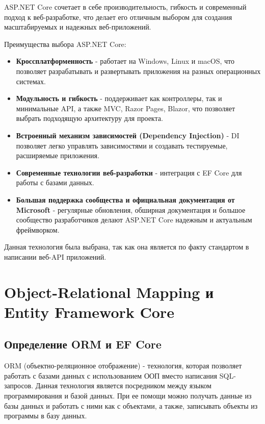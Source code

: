 \documentclass[a4paper,12pt]{report}
\begin{document}
ASP.NET Core сочетает в себе производительность, гибкость и современный подход к веб-разработке, что делает его отличным выбором 
для создания масштабируемых и надежных веб-приложений.

Преимущества выбора ASP.NET Core:
\begin{itemize}
    \item
        \textbf{Кроссплатформенность} - работает на Windows, Linux и macOS, что позволяет разрабатывать и развертывать приложения на разных операционных системах.
    \item 
        \textbf{Модульность и гибкость} - поддерживает как контроллеры, так и минимальные \acs{API}, а также \acs{MVC}, Razor Pages, Blazor, что позволяет выбрать 
        подходящую архитектуру для проекта.
    \item
        \textbf{Встроенный механизм зависимостей (Dependency Injection)} - \acs{DI} позволяет легко управлять зависимостями и создавать тестируемые, расширяемые приложения.
    \item
        \textbf{Современные технологии веб-разработки} - интеграция с \acs{EF} Core для работы с базами данных.
    \item
        \textbf{Большая поддержка сообщества и официальная документация от Microsoft} - регулярные обновления, обширная документация и большое сообщество 
        разработчиков делают ASP.NET Core надежным и актуальным фреймворком.
\end{itemize}

Данная технология была выбрана, так как она является по факту стандартом в написании веб-\acs{API} приложений.

\section{Object-Relational Mapping и Entity Framework Core}

\subsection{Определение \acs{ORM} и \acs{EF} Core}

\acs{ORM} (объектно-реляционное отображение) - технология, которая позволяет работать с базами данных 
с использованием \acs{ООП} вместо написания \acs{SQL}-запросов. Данная технология является посредником между языком программирования и базой данных. 
При ее помощи можно получать данные из базы данных и работать с ними как с объектами, а также, записывать объекты из программы в базу данных.
\end{document}
